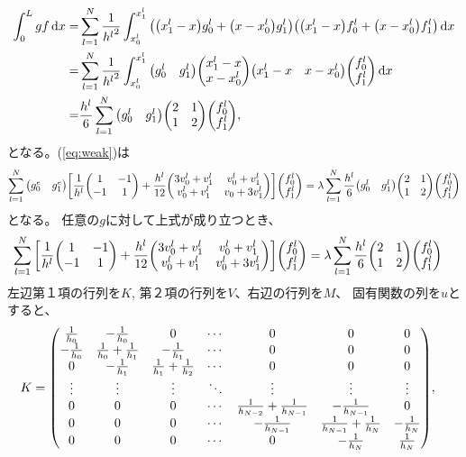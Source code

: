 \documentclass[xelatex,ja=standard]{bxjsarticle}
\begin{document}
\begin{align}
    \int_0^L gf\dd{x}
    =& \sum_{l=1}^N \frac{1}{{h^l}^2}\int_{x^l_0}^{x^l_1}
    \qty(\qty(x^l_1 - x)g^l_0 + \qty(x-x^l_0)g^l_1)\qty(\qty(x^l_1 - x)f^l_0 + \qty(x-x^l_0)f^l_1)
    \dd{x}\notag\\
    =& \sum_{l=1}^N \frac{1}{{h^l}^2}\int_{x^l_0}^{x^l_1}
    \mqty(g^l_0 & g^l_1) \mqty(x^l_1 - x \\ x-x^l_0)\mqty(x^l_1 - x & x-x^l_0)\mqty(f^l_0 \\ f^l_1)
    \dd{x}\notag\\
    =& \frac{h^l}{6}\sum_{l=1}^N 
    \mqty(g^l_0 & g^l_1) \mqty(2 & 1\\ 1&2)\mqty(f^l_0 \\ f^l_1),
\end{align}
となる。(\ref{eq:weak})は
\begin{align}
    \sum_{l=1}^N \mqty(g^e_0 & g^e_1)\bigg[\frac{1}{h^l}\mqty(1 & -1 \\ -1 & 1)
     + \frac{h^l}{12}\mqty(3v_{0}^l +v_{1}^l & v_{0}^l +v_{1}^l\\ v_{0}^l +v_{1}^l&v_{0} +3v_{1}^l)\bigg]\mqty(f^l_0 \\ f^l_1)=\lambda\sum_{l=1}^N \frac{h^l}{6} \mqty(g^l_0 & g^l_1)\mqty(2 & 1\\1& 2)\mqty(f^l_0 \\ f^l_1)
\end{align}
となる。 任意の$g$に対して上式が成り立つとき、
\begin{align}
    \sum_{l=1}^N \bigg[\frac{1}{h^l}\mqty(1 & -1 \\ -1 & 1)
     + \frac{h^l}{12}\mqty(3v_{0}^l +v_{1}^l & v_{0}^l +v_{1}^l\\ v_{0}^l +v_{1}^l&v_{0}^l +3v_{1}^l)\bigg]\mqty(f^l_0 \\ f^l_1)&=\lambda\sum_{l=1}^N\frac{h^l}{6} \mqty(2 & 1\\1& 2)\mqty(f^l_0 \\ f^l_1)
\end{align}     
左辺第１項の行列を$K$, 第２項の行列を$V$、右辺の行列を$M$、 固有関数の列を$u$とすると、
\begin{align}
    K&=
     \mqty(
     \frac{1}{h_0} & -\frac{1}{h_0} & 0 & \cdots & 0 & 0 & 0 \\
     -\frac{1}{h_0} & \frac{1}{h_0} + \frac{1}{h_1} & -\frac{1}{h_1} & \cdots & 0 & 0 & 0 \\
     0 & -\frac{1}{h_1} & \frac{1}{h_1} + \frac{1}{h_2} & \cdots & 0 & 0 & 0 \\
     \vdots & \vdots & \vdots & \ddots & \vdots  & \vdots& \vdots\\
     0 & 0 & 0 & \cdots & \frac{1}{h_{N-2}} + \frac{1}{h_{N-1}} & -\frac{1}{h_{N-1}} & 0 \\
     0 & 0 & 0 & \cdots & -\frac{1}{h_{N-1}} &\frac{1}{h_{N-1}} + \frac{1}{h_N} & -\frac{1}{h_N} \\
     0 & 0 & 0 & \cdots & 0 & -\frac{1}{h_N}& \frac{1}{h_N} \\
     ),
\end{align}
\end{document}
